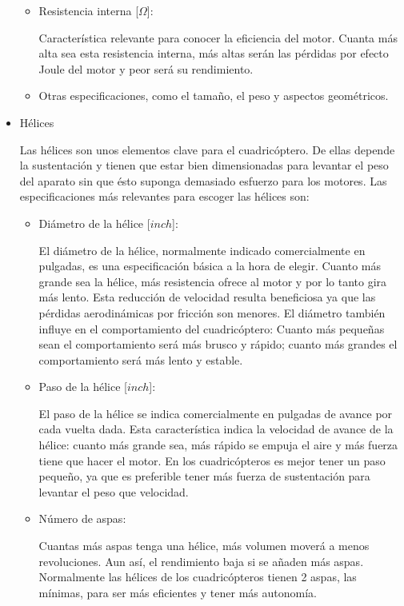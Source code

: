 \documentclass[12pt,twoside]{article}
\begin{document}
\begin{itemize}
\begin{itemize}
				\item Resistencia interna [$\Omega$]:
					
				Característica relevante para conocer la eficiencia del motor. Cuanta más alta sea esta resistencia interna, más altas serán las pérdidas por efecto Joule del motor y peor será su rendimiento.
				
				\item Otras especificaciones, como el tamaño, el peso y aspectos geométricos.
			\end{itemize}
			
		\item Hélices
		
		Las hélices son unos elementos clave para el cuadricóptero. De ellas depende la sustentación y tienen que estar bien dimensionadas para levantar el peso del aparato sin que ésto suponga demasiado esfuerzo para los motores. Las especificaciones más relevantes para escoger las hélices son:
		
		\begin{itemize}
			\item Diámetro de la hélice [$inch$]:
			
				El diámetro de la hélice, normalmente indicado comercialmente en pulgadas, es una especificación básica a la hora de elegir. Cuanto más grande sea la hélice, más resistencia ofrece al motor y por lo tanto gira más lento. Esta reducción de velocidad resulta beneficiosa ya que las pérdidas aerodinámicas por fricción son menores. El diámetro también influye en el comportamiento del cuadricóptero: Cuanto más pequeñas sean el comportamiento será más brusco y rápido; cuanto más grandes el comportamiento será más lento y estable.
				
			\item Paso de la hélice [$inch$]:
			
				El paso de la hélice se indica comercialmente en pulgadas de avance por cada vuelta dada. Esta característica indica la velocidad de avance de la hélice: cuanto más grande sea, más rápido se empuja el aire y más fuerza tiene que hacer el motor. En los cuadricópteros es mejor tener un paso pequeño, ya que es preferible tener más fuerza de sustentación para levantar el peso que velocidad.
				
			\item Número de aspas:
			
				Cuantas más aspas tenga una hélice, más volumen moverá a menos revoluciones. Aun así, el rendimiento baja si se añaden más aspas. Normalmente las hélices de los cuadricópteros tienen 2 aspas, las mínimas, para ser más eficientes y tener más autonomía.
				

\end{itemize}
\end{itemize}
\end{document}
